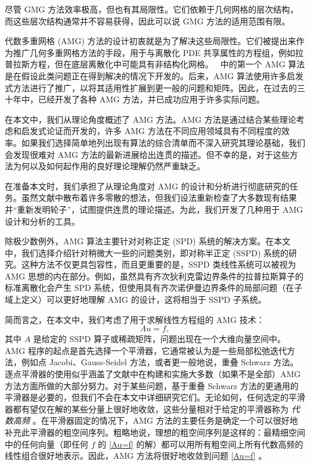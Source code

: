 \documentclass[12pt]{acta_2011xz}
\begin{document}
尽管 GMG 方法效率极高，但也有其局限性。它们依赖于几何网格的层次结构，而这些层次结构通常并不容易获得，因此可以说 GMG 方法的适用范围有限。  

代数多重网格 (AMG) 方法的设计初衷就是为了解决这些局限性。它们被提出来作为推广几何多重网格方法的手段，用于与离散化 PDE 共享属性的方程组，例如拉普拉斯方程，但在底层离散化中可能具有非结构化网格。~   \cite{Brandt.A;McCormick.S;Ruge.J.1982a}    中的第一个 AMG 算法是在假设此类问题正在得到解决的情况下开发的。后来，AMG 算法使用许多启发式方法进行了推广，以将其适用性扩展到更一般的问题和矩阵。因此，在过去的三十年中，已经开发了各种 AMG 方法，并已成功应用于许多实际问题。  

在本文中，我们从理论角度概述了 AMG 方法。AMG 方法是通过结合某些理论考虑和启发式论证而开发的，许多 AMG 方法在不同应用领域具有不同程度的效率。如果我们选择简单地列出现有算法的综合清单而不深入研究其理论基础，我们会发现很难对 AMG 方法的最新进展给出连贯的描述。但不幸的是，对于这些方法为何以及如何起作用的良好理论理解仍然严重缺乏。  

在准备本文时，我们承担了从理论角度对 AMG 的设计和分析进行彻底研究的任务。虽然文献中散布着许多零散的想法，但我们设法重新检查了大多数现有结果并“重新发明轮子”，试图提供连贯的理论描述。为此，我们开发了几种用于 AMG 设计和分析的工具。  

除极少数例外，AMG 算法主要针对对称正定 (SPD) 系统的解决方案。在本文中，我们选择介绍针对稍微大一些的问题类别，即对称半正定 (SSPD) 系统的研究。这种方法不仅更具包容性，而且更重要的是，SSPD 类线性系统可以被视为 AMG 思想的内在部分。例如，虽然具有齐次狄利克雷边界条件的拉普拉斯算子的标准离散化会产生 SPD 系统，但使用具有齐次诺伊曼边界条件的局部问题（在子域上定义）可以更好地理解 AMG 的设计，这将相当于 SSPD 子系统。  

简而言之，在本文中，我们考虑了用于求解线性方程组的 AMG 技术：
   \begin{equation}
  \label{Au=f}
	Au =f,
\end{equation}    其中    $A$    是给定的 SSPD 算子或稀疏矩阵，问题出现在一个大维向量空间中。AMG 程序的起点是首先选择一个平滑器，它通常被认为是一些局部松弛迭代方法，例如点 Jacobi、Gauss-Seidel 方法，或者更一般地说，重叠 Schwarz 方法。逐点平滑器的使用似乎涵盖了文献中在构建和实施大多数（如果不是全部）AMG 方法方面所做的大部分努力。对于某些问题，基于重叠 Schwarz 方法的更通用的平滑器是必要的，但我们不会在本文中详细研究它们。无论如何，任何选定的平滑器都有望仅在解的某些分量上很好地收敛，这些分量相对于给定的平滑器称为  {    \it    代数高频   } 。在平滑器固定的情况下，AMG 方法的主要任务是确定一个可以很好地补充此平滑器的粗空间序列。粗略地说，理想的粗空间序列是这样的：最精细空间中的任何向量（即任何    $f$    的    \eqref{Au=f}    的解）都可以用所有粗空间上所有代数高频的线性组合很好地表示。因此，AMG 方法将很好地收敛到问题    \eqref{Au=f}    。  
\end{document}
